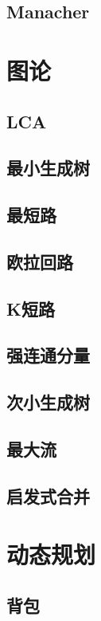 \documentclass[twocolumn,a4]{article}
\newcommand{\addcpp}[1]{}
\begin{document}
	\subsection{Manacher}
		\addcpp{string/Manacher.tex}

\section{图论}
	\subsection{LCA}
		\addcpp{graph/LCA.tex}
	\subsection{最小生成树}
		\addcpp{graph/mst.tex}
	\subsection{最短路}
		\addcpp{graph/zuiduanlu.tex}
	\subsection{欧拉回路}
		\addcpp{graph/oulahuilu.tex}
	\subsection{K短路}
		\addcpp{graph/kth.tex}
	\subsection{强连通分量}
		\addcpp{graph/qltfl.tex}
	\subsection{次小生成树}
		\addcpp{graph/SMST.tex}
	\subsection{最大流}
		\addcpp{graph/zuidaliu.tex}
	\subsection{启发式合并}
		\addcpp{ds/qifashihebing.tex}
		

\section{动态规划}
	\subsection{背包}
		\addcpp{dp/backpack.tex}
\end{document}
